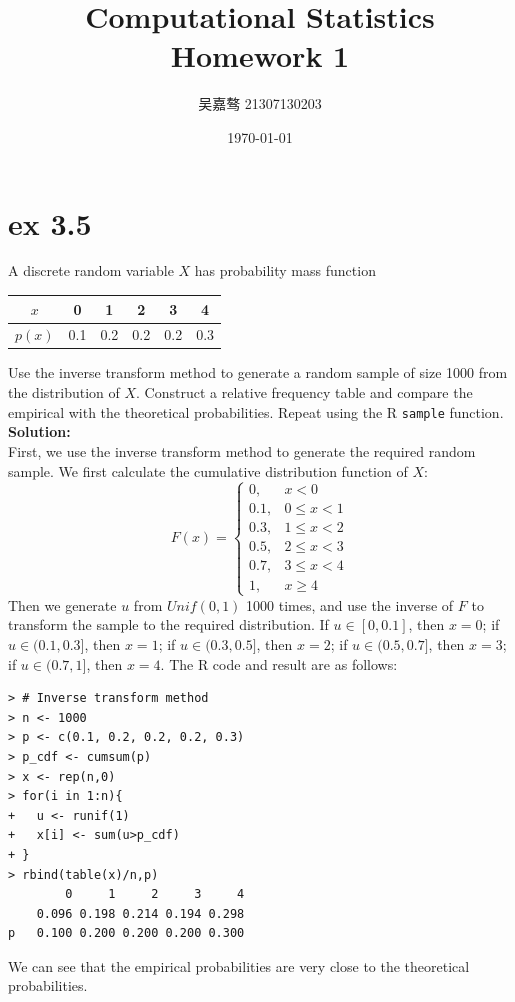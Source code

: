 \documentclass[UTF8]{ctexart}
\title{\textbf{Computational Statistics Homework 1}}
\author{吴嘉骜 21307130203}
\date{\today}
\begin{document}
\maketitle

\noindent
\section{ex 3.5}
\setlength{\parindent}{0pt}
A discrete random variable $X$ has probability mass function
\begin{table}[H]
    \centering
    \begin{tabular}{cccccc}
        $x$ & 0 & 1 & 2 & 3 & 4 \\
        \hline
        $p(x)$ & 0.1 & 0.2 & 0.2 & 0.2 & 0.3
    \end{tabular}
\end{table}
Use the inverse transform method to generate a random sample of size 1000
from the distribution of $X$. Construct a relative frequency table and compare
the empirical with the theoretical probabilities. Repeat using the R \texttt{sample}
function.\\
\textbf{Solution:}\\
First, we use the inverse transform method to generate the required random sample. We first calculate the cumulative distribution function of $X$:
\begin{equation*}
    F(x) = \begin{cases}
        0, & x < 0 \\
        0.1, & 0 \leq x < 1 \\
        0.3, & 1 \leq x < 2 \\
        0.5, & 2 \leq x < 3 \\
        0.7, & 3 \leq x < 4 \\
        1, & x \geq 4
    \end{cases}
\end{equation*}
Then we generate $u$ from $Unif(0, 1)$ 1000 times, and use the inverse of $F$ to transform the sample to the required distribution. If $u \in [0, 0.1]$, 
then $x = 0$; if $u \in (0.1, 0.3]$, then $x = 1$; if $u \in (0.3, 0.5]$, then $x = 2$; if $u \in (0.5, 0.7]$, then $x = 3$; if $u \in (0.7, 1]$, then $x = 4$. 
The R code and result are as follows:
\begin{lstlisting}
> # Inverse transform method
> n <- 1000
> p <- c(0.1, 0.2, 0.2, 0.2, 0.3)
> p_cdf <- cumsum(p)
> x <- rep(n,0)
> for(i in 1:n){
+   u <- runif(1)
+   x[i] <- sum(u>p_cdf)
+ }
> rbind(table(x)/n,p)
        0     1     2     3     4
    0.096 0.198 0.214 0.194 0.298
p   0.100 0.200 0.200 0.200 0.300
\end{lstlisting}
We can see that the empirical probabilities are very close to the theoretical probabilities.\\
\end{document}
